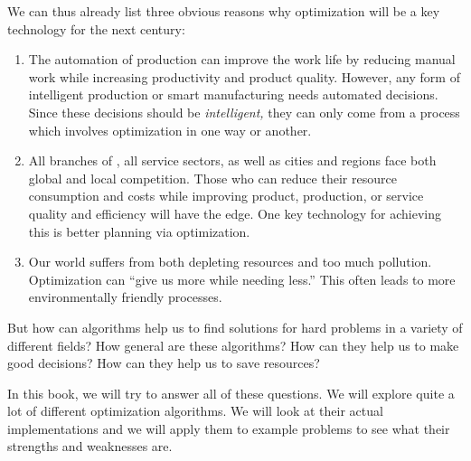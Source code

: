 We can thus already list three obvious reasons why optimization will be a key technology for the next century:%
%
\begin{enumerate}%
%
\item The automation of production can improve the work life by reducing manual work while increasing productivity and product quality.
However, any form of intelligent production or smart manufacturing needs automated decisions.
Since these decisions should be \emph{intelligent,} they can only come from a process which involves optimization in one way or another.%
%
\item All branches of , all service sectors, as well as cities and regions face both global and local competition.
Those who can reduce their resource consumption and costs while improving product, production, or service quality and efficiency will have the edge.
One key technology for achieving this is better planning via optimization.%
%
\item Our world suffers from both depleting resources and too much pollution.
Optimization can ``give us more while needing less.''
This often leads to more environmentally friendly processes.%
%
\end{enumerate}%
%
But how can algorithms help us to find solutions for hard problems in a variety of different fields?
How general are these algorithms?
How can they help us to make good decisions?
How can they help us to save resources?

In this book, we will try to answer all of these questions.
We will explore quite a lot of different optimization algorithms.
We will look at their actual implementations and we will apply them to example problems to see what their strengths and weaknesses are.%
%
%
%
%
\endhsection\endhsection%
%

